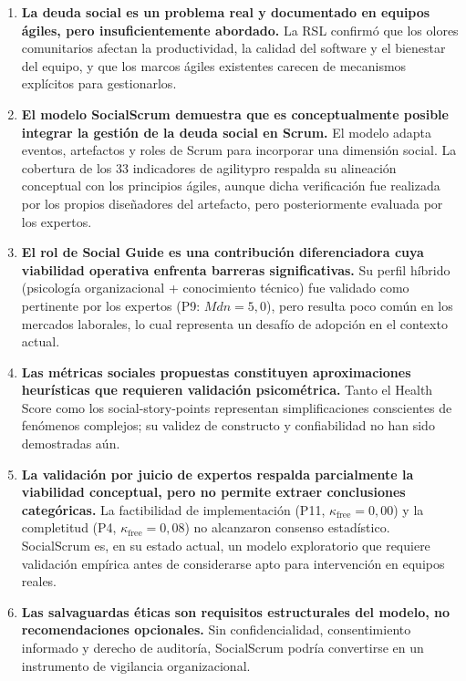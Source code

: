 \begin{enumerate}
    \item \textbf{La deuda social es un problema real y documentado en equipos ágiles, pero insuficientemente abordado.} La RSL confirmó que los olores comunitarios afectan la productividad, la calidad del software y el bienestar del equipo, y que los marcos ágiles existentes carecen de mecanismos explícitos para gestionarlos.

    \item \textbf{El modelo SocialScrum demuestra que es conceptualmente posible integrar la gestión de la deuda social en Scrum.} El modelo adapta eventos, artefactos y roles de Scrum para incorporar una dimensión social. La cobertura de los 33 indicadores de \gls{agilitypro} respalda su alineación conceptual con los principios ágiles, aunque dicha verificación fue realizada por los propios diseñadores del artefacto, pero posteriormente evaluada por los expertos.

    \item \textbf{El rol de Social Guide es una contribución diferenciadora cuya viabilidad operativa enfrenta barreras significativas.} Su perfil híbrido (psicología organizacional + conocimiento técnico) fue validado como pertinente por los expertos (P9: $Mdn = 5{,}0$), pero resulta poco común en los mercados laborales, lo cual representa un desafío de adopción en el contexto actual.

    \item \textbf{Las métricas sociales propuestas constituyen aproximaciones heurísticas que requieren validación psicométrica.} Tanto el Health Score como los \gls{social-story-points} representan simplificaciones conscientes de fenómenos complejos; su validez de constructo y confiabilidad no han sido demostradas aún.

    \item \textbf{La validación por juicio de expertos respalda parcialmente la viabilidad conceptual, pero no permite extraer conclusiones categóricas.} La factibilidad de implementación (P11, $\kappa_{\text{free}} = 0{,}00$) y la completitud (P4, $\kappa_{\text{free}} = 0{,}08$) no alcanzaron consenso estadístico. SocialScrum es, en su estado actual, un modelo exploratorio que requiere validación empírica antes de considerarse apto para intervención en equipos reales.

    \item \textbf{Las salvaguardas éticas son requisitos estructurales del modelo, no recomendaciones opcionales.} Sin confidencialidad, consentimiento informado y derecho de auditoría, SocialScrum podría convertirse en un instrumento de vigilancia organizacional.
\end{enumerate}

